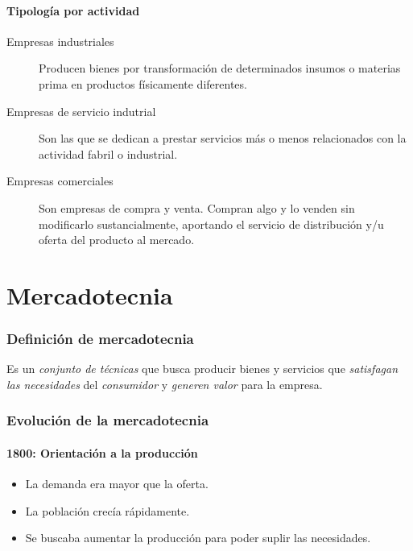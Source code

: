 \documentclass[12pt, spanish, a5paper]{article}
\begin{document}
\subsection{Tipología por actividad}
\begin{description}
	\item[Empresas industriales] Producen bienes por transformación de determinados insumos o materias prima en productos físicamente diferentes.
	
	\item[Empresas de servicio indutrial] Son las que se dedican a prestar servicios más o menos relacionados con la actividad fabril o industrial.
	
	\item[Empresas comerciales] Son empresas de compra y venta. Compran algo y lo venden sin modificarlo sustancialmente, aportando el servicio de distribución y/u oferta del producto al mercado.
\end{description}



\part{Mercadotecnia}

\section{Definición de mercadotecnia}
Es un \emph{conjunto de técnicas} que busca producir bienes y servicios que \emph{satisfagan las necesidades} del \emph{consumidor} y \emph{generen valor} para la empresa.

\section{Evolución de la mercadotecnia}

\subsection{1800: Orientación a la producción}

\begin{itemize}
	\item La demanda era mayor que la oferta.
	\item La población crecía rápidamente.
	\item Se buscaba aumentar la producción para poder suplir las necesidades.
\end{itemize}
\end{document}
